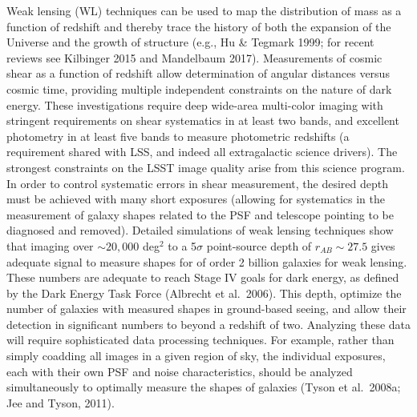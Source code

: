 Weak lensing (WL) techniques can be used to map the distribution of
mass as a function of redshift and thereby trace the history of both
the expansion of the Universe and the growth of structure (e.g., Hu \&
Tegmark 1999; for recent reviews see Kilbinger 2015 and Mandelbaum 2017).  Measurements of cosmic shear as a function of
redshift allow determination of angular distances versus cosmic time,
providing multiple independent constraints on the nature of dark
energy.  These investigations require deep wide-area multi-color
imaging with stringent requirements on shear systematics in at least
two bands, and excellent photometry in at least five bands to measure
photometric redshifts (a requirement shared with LSS, and indeed all
extragalactic science drivers). The strongest constraints on the LSST
image quality arise from this science program. In order to control
systematic errors in shear measurement, the desired depth must be
achieved with many short exposures (allowing for systematics in the
measurement of galaxy shapes related
to the PSF and telescope pointing to be diagnosed and removed). Detailed simulations of
weak lensing techniques show that imaging over $\sim20,000$ deg$^2$ to
a 5$\sigma$ point-source depth of $r_{AB} \sim 27.5$ gives adequate
signal to measure shapes for of order 2 billion galaxies for weak
lensing.  These numbers are adequate to reach
Stage IV goals for dark energy, as defined by the Dark Energy Task
Force (Albrecht et al.~2006).
This
depth, 
optimize the number of galaxies with measured shapes in ground-based
seeing, and allow their detection in significant numbers to beyond a
redshift of two.  Analyzing these data will
require sophisticated data processing techniques.  For example, rather
than simply coadding all images in a given region of sky, the
individual exposures, each with their own PSF and noise
characteristics,  should be analyzed simultaneously to optimally
measure the shapes of galaxies (Tyson et al.~2008a;
Jee and Tyson, 2011).

